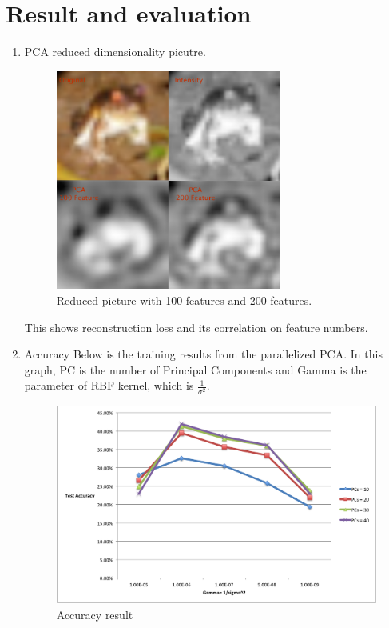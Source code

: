 \documentclass[a4paper]{article}
\begin{document}
\section{Result and evaluation}
\begin{enumerate}
\item PCA reduced dimensionality picutre.\\
\begin{figure}[!htb]
\centering
\includegraphics[width=0.7\textwidth]{pca}
\caption{\label{fig:pca}Reduced picture with 100 features and 200 features.}
\end{figure}
This shows reconstruction loss and its correlation on feature numbers.
\item Accuracy
Below is the training results from the parallelized PCA. In this graph, PC is the number of Principal Components and Gamma is the parameter of RBF kernel, which is $\frac{1}{\sigma^2}$.
\begin{figure}[!htb]
\centering
\includegraphics[width=1.0\textwidth]{accuracy.png}
\caption{\label{fig:pca}Accuracy result}
\end{figure}
\end{enumerate}
\end{document}
